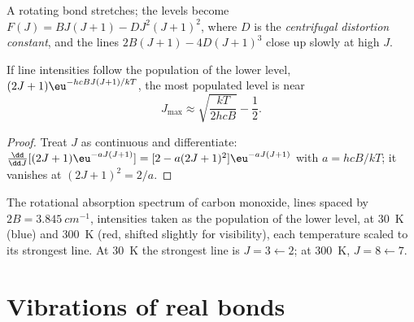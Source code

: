 \begin{definition}\label{def:b3:rovibrational-spectroscopy:centrifugal}
A rotating bond stretches; the levels become $F(J) = BJ(J+1) - DJ^2(J+1)^2$,
where $D$ is the \emph{centrifugal distortion constant}, and the lines $2B(J+1) - 4D(J+1)^3$ close up slowly at
high $J$.
\end{definition}

\begin{proposition}\label{prop:b3:rovibrational-spectroscopy:jmax}
If line intensities follow the population of the lower level, $(2J+1)
\eu^{-hcBJ(J+1)/kT}$, the most populated level is near
\[
J_{\max} \approx \sqrt{\frac{kT}{2hcB}} - \frac12.
\]
\end{proposition}

\begin{proof}
Treat $J$ as continuous and differentiate: $\frac{\dd}{\dd J}[(2J+1)\eu^{-aJ(J+1)}]
= [2 - a(2J+1)^2]\eu^{-aJ(J+1)}$ with $a = hcB/kT$; it vanishes at $(2J + 1)^2 =
2/a$.
\end{proof}

\begin{omfigure}

{\small The rotational absorption spectrum of carbon monoxide, lines spaced
by $2B = \qty{3.845}{cm^{-1}}$, intensities taken as the population of the
lower level, at \qty{30}{K} (blue) and \qty{300}{K} (red, shifted slightly for
visibility), each temperature scaled to its strongest line. At \qty{30}{K} the strongest line is
$J = 3 \leftarrow 2$; at \qty{300}{K}, $J = 8 \leftarrow 7$.}
\end{omfigure}

\section{Vibrations of real bonds}\label{sec:b3:rovibrational-spectroscopy:real-bonds}

